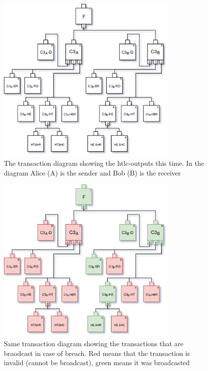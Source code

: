 \begin{figure}[H]
	\centering
	\includegraphics[width=0.80\textwidth]{background/images/payment_channel_htlc.png}
	\caption{The transaction diagram showing the htlc-outputs this time. In the diagram Alice (A) is the sender and Bob (B) is the receiver}
	\label{fig:pc-htlc}
\end{figure}

\begin{figure}[H]
	\centering
	\includegraphics[width=0.80\textwidth]{background/images/payment_channel_htlc_revoked_alice.png}
	\caption{Same transaction diagram showing the transactions that are braodcast in case of breach. Red means that the transaction is invalid (cannot be broadcast), green means it was broadcasted}
	\label{fig:pc-htlc-revoked-alice}
\end{figure}

